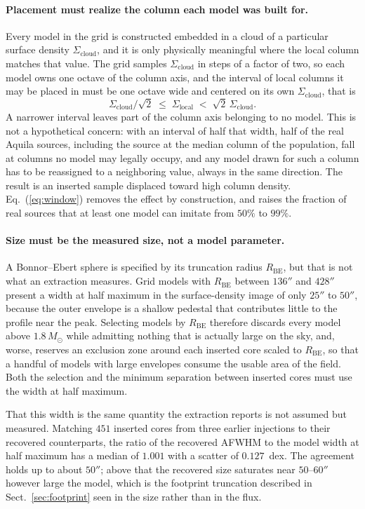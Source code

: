 \documentclass[11pt,a4paper]{article}
\newcommand{\msun}{M_{\odot}}
\newcommand{\Rbe}{R_{\mathrm{BE}}}
\newcommand{\Scloud}{\Sigma_{\mathrm{cloud}}}
\begin{document}
\paragraph{Placement must realize the column each model was built for.}
Every model in the grid is constructed embedded in a cloud of a particular
surface density $\Scloud$, and it is only physically meaningful where the local
column matches that value. The grid samples $\Scloud$ in steps of a factor of
two, so each model owns one octave of the column axis, and the interval of
local columns it may be placed in must be one octave wide and centered on its
own $\Scloud$, that is
\begin{equation}
  \Scloud/\sqrt{2} \;\le\; \Sigma_{\mathrm{local}} \;<\; \sqrt{2}\,\Scloud .
  \label{eq:window}
\end{equation}
A narrower interval leaves part of the column axis belonging to no model.
This is not a hypothetical concern: with an interval of half that width, half
of the real Aquila sources, including the source at the median column of the
population, fall at columns no model may legally occupy, and any model drawn
for such a column has to be reassigned to a neighboring value, always in the
same direction. The result is an inserted sample displaced toward high column
density. Eq.~(\ref{eq:window}) removes the effect by construction, and raises
the fraction of real sources that at least one model can imitate from
$50\%$ to $99\%$.

\paragraph{Size must be the measured size, not a model parameter.}
A Bonnor--Ebert sphere is specified by its truncation radius $\Rbe$, but that
is not what an extraction measures. Grid models with $\Rbe$ between $136''$
and $428''$ present a width at half maximum in the surface-density image of
only $25''$ to $50''$, because the outer envelope is a shallow pedestal that
contributes little to the profile near the peak. Selecting models by $\Rbe$
therefore discards every model above $1.8\,\msun$ while admitting nothing that
is actually large on the sky, and, worse, reserves an exclusion zone around
each inserted core scaled to $\Rbe$, so that a handful of models with large
envelopes consume the usable area of the field. Both the selection and the
minimum separation between inserted cores must use the width at half maximum.

That this width is the same quantity the extraction reports is not assumed but
measured. Matching $451$ inserted cores from three earlier injections to their
recovered counterparts, the ratio of the recovered AFWHM to the model width at
half maximum has a median of $1.001$ with a scatter of $0.127$~dex. The
agreement holds up to about $50''$; above that the recovered size saturates
near $50$--$60''$ however large the model, which is the footprint truncation
described in Sect.~\ref{sec:footprint} seen in the size rather than in the
flux.
\end{document}
